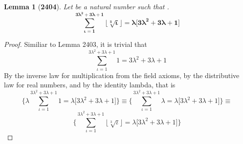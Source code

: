 \documentclass[preview]{standalone}
\newtheorem*{lemma*}{Lemma}
\begin{document}
\begin{lemma*}[\textbf{2404}]
    Let \bm{$\iota$} be a natural number such that
    \bm{$\big \lfloor \sqrt[3] \iota \big \rfloor = \lambda$}.
    \begin{equation*}
        \bm{
            \sum_{\iota=1}^{ 3 \lambda ^2 + 3 \lambda + 1 } 
                    \big \lfloor \sqrt[3] \iota \big \rfloor
                =
            \lambda \big [ 3 \lambda ^2 + 3 \lambda + 1 \big ]
        }
    \end{equation*}
\end{lemma*}

\begin{proof}
    Similiar to Lemma 2403, it is trivial that
    \begin{equation*}
        \sum_{\iota=1}^{ 3 \lambda ^2 + 3 \lambda + 1 } 
                    1
                =
            3 \lambda ^2 + 3 \lambda + 1
    \end{equation*}
    By the inverse law for multiplication from the field axioms,
    by the distributive law for real numbers, 
    and by the identity lambda, that is
    \begin{equation*}
        \Bigg \{
            \lambda \sum_{\iota=1}^{ 3 \lambda ^2 + 3 \lambda + 1 } 
                        1
                    =
            \lambda \big [ 3 \lambda ^2 + 3 \lambda + 1 \big ]
        \Bigg \}
            \equiv
        \Bigg \{
            \sum_{\iota=1}^{ 3 \lambda ^2 + 3 \lambda + 1 } 
                        \lambda
                    =
            \lambda \big [ 3 \lambda ^2 + 3 \lambda + 1 \big ]
        \Bigg \}
            \equiv
    \end{equation*}
    \begin{equation*}
        \Bigg \{
            \sum_{\iota=1}^{ 3 \lambda ^2 + 3 \lambda + 1 } 
                        \big \lfloor \sqrt[3] \iota \big \rfloor
                    =
            \lambda \big [ 3 \lambda ^2 + 3 \lambda + 1 \big ]
        \Bigg \}
    \end{equation*}
\color{lightgray} \end{proof}
\end{document}
